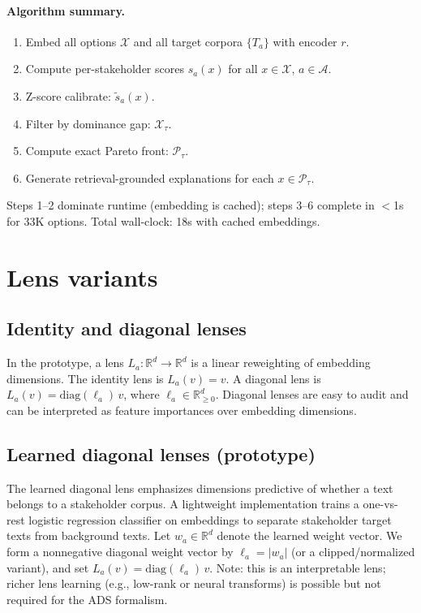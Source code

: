 \documentclass[sigconf,review]{acmart}
\newcommand{\MainRuntimeSec}{18}             %
\begin{document}
\paragraph{Algorithm summary.}
\begin{enumerate}
  \item Embed all options $\mathcal{X}$ and all target corpora $\{T_a\}$ with encoder $r$.
  \item Compute per-stakeholder scores $s_a(x)$ for all $x\in\mathcal{X}$, $a\in\mathcal{A}$.
  \item Z-score calibrate: $\tilde{s}_a(x)$.
  \item Filter by dominance gap: $\mathcal{X}_\tau$.
  \item Compute exact Pareto front: $\mathcal{P}_\tau$.
  \item Generate retrieval-grounded explanations for each $x\in\mathcal{P}_\tau$.
\end{enumerate}

Steps 1--2 dominate runtime (embedding is cached); steps 3--6 complete in $<$1s for 33K options. Total wall-clock: {\MainRuntimeSec}s with cached embeddings.


\section{Lens variants}
\label{sec:supp-lenses}
\subsection{Identity and diagonal lenses}
In the prototype, a lens $L_a:\mathbb{R}^d\to\mathbb{R}^d$ is a linear reweighting of embedding dimensions.
The identity lens is $L_a(v)=v$.
A diagonal lens is $L_a(v)=\mathrm{diag}(\ell_a)\,v$, where $\ell_a\in\mathbb{R}_{\ge 0}^d$.
Diagonal lenses are easy to audit and can be interpreted as feature importances over embedding dimensions.

\subsection{Learned diagonal lenses (prototype)}
The learned diagonal lens emphasizes dimensions predictive of whether a text belongs to a stakeholder corpus.
A lightweight implementation trains a one-vs-rest logistic regression classifier on embeddings to separate stakeholder target texts from background texts.
Let $w_a\in\mathbb{R}^d$ denote the learned weight vector. We form a nonnegative diagonal weight vector by $\ell_a = |w_a|$ (or a clipped/normalized variant), and set $L_a(v)=\mathrm{diag}(\ell_a)\,v$.
{Note:} this is an interpretable lens; richer lens learning (e.g., low-rank or neural transforms) is possible but not required for the ADS formalism.
\end{document}
